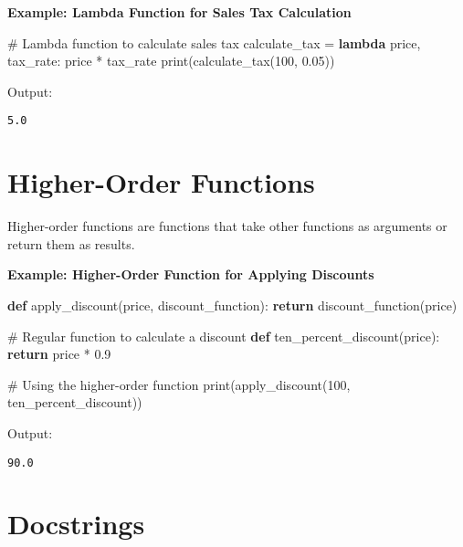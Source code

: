 \documentclass[
  letterpaper,
  DIV=11,
  numbers=noendperiod]{scrreprt}
\newenvironment{Shaded}{\begin{snugshade}}{\end{snugshade}}
\newcommand{\BuiltInTok}[1]{\textcolor[rgb]{0.00,0.23,0.31}{#1}}
\newcommand{\CommentTok}[1]{\textcolor[rgb]{0.37,0.37,0.37}{#1}}
\newcommand{\ControlFlowTok}[1]{\textcolor[rgb]{0.00,0.23,0.31}{\textbf{#1}}}
\newcommand{\DecValTok}[1]{\textcolor[rgb]{0.68,0.00,0.00}{#1}}
\newcommand{\FloatTok}[1]{\textcolor[rgb]{0.68,0.00,0.00}{#1}}
\newcommand{\KeywordTok}[1]{\textcolor[rgb]{0.00,0.23,0.31}{\textbf{#1}}}
\newcommand{\NormalTok}[1]{\textcolor[rgb]{0.00,0.23,0.31}{#1}}
\newcommand{\OperatorTok}[1]{\textcolor[rgb]{0.37,0.37,0.37}{#1}}
\begin{document}
\textbf{Example: Lambda Function for Sales Tax Calculation}

\begin{Shaded}
\begin{Highlighting}[]
\CommentTok{\# Lambda function to calculate sales tax}
\NormalTok{calculate\_tax }\OperatorTok{=} \KeywordTok{lambda}\NormalTok{ price, tax\_rate: price }\OperatorTok{*}\NormalTok{ tax\_rate}
\BuiltInTok{print}\NormalTok{(calculate\_tax(}\DecValTok{100}\NormalTok{, }\FloatTok{0.05}\NormalTok{))}
\end{Highlighting}
\end{Shaded}

Output:

\begin{verbatim}
5.0
\end{verbatim}

\section{Higher-Order Functions}\label{higher-order-functions}

Higher-order functions are functions that take other functions as
arguments or return them as results.

\textbf{Example: Higher-Order Function for Applying Discounts}

\begin{Shaded}
\begin{Highlighting}[]
\KeywordTok{def}\NormalTok{ apply\_discount(price, discount\_function):}
    \ControlFlowTok{return}\NormalTok{ discount\_function(price)}

\CommentTok{\# Regular function to calculate a discount}
\KeywordTok{def}\NormalTok{ ten\_percent\_discount(price):}
    \ControlFlowTok{return}\NormalTok{ price }\OperatorTok{*} \FloatTok{0.9}

\CommentTok{\# Using the higher{-}order function}
\BuiltInTok{print}\NormalTok{(apply\_discount(}\DecValTok{100}\NormalTok{, ten\_percent\_discount))}
\end{Highlighting}
\end{Shaded}

Output:

\begin{verbatim}
90.0
\end{verbatim}

\section{Docstrings}\label{docstrings}
\end{document}
